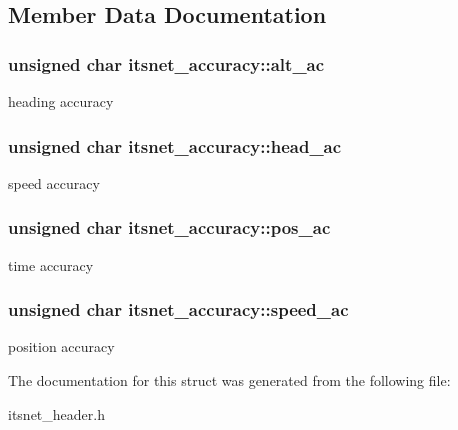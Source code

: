 \subsection{\-Member \-Data \-Documentation}
\hypertarget{structitsnet__accuracy_a5bcb1aa5a4fa5671af7fc234fd1ff14c}{
\subsubsection[{alt\-\_\-ac}]{\setlength{\rightskip}{0pt plus 5cm}unsigned char {\bf itsnet\-\_\-accuracy\-::alt\-\_\-ac}}}\label{structitsnet__accuracy_a5bcb1aa5a4fa5671af7fc234fd1ff14c}
heading accuracy \hypertarget{structitsnet__accuracy_a08bb692a2154f4499d2749034774d48f}{
\subsubsection[{head\-\_\-ac}]{\setlength{\rightskip}{0pt plus 5cm}unsigned char {\bf itsnet\-\_\-accuracy\-::head\-\_\-ac}}}\label{structitsnet__accuracy_a08bb692a2154f4499d2749034774d48f}
speed accuracy \hypertarget{structitsnet__accuracy_acde597cca8f6b0df3fa50d0c7ac3314c}{
\subsubsection[{pos\-\_\-ac}]{\setlength{\rightskip}{0pt plus 5cm}unsigned char {\bf itsnet\-\_\-accuracy\-::pos\-\_\-ac}}}\label{structitsnet__accuracy_acde597cca8f6b0df3fa50d0c7ac3314c}
time accuracy \hypertarget{structitsnet__accuracy_aade23fb3b4f231e31eb464e88cf2dae1}{
\subsubsection[{speed\-\_\-ac}]{\setlength{\rightskip}{0pt plus 5cm}unsigned char {\bf itsnet\-\_\-accuracy\-::speed\-\_\-ac}}}\label{structitsnet__accuracy_aade23fb3b4f231e31eb464e88cf2dae1}
position accuracy 

\-The documentation for this struct was generated from the following file\-:\begin{DoxyCompactItemize}
\item 
itsnet\-\_\-header.\-h\end{DoxyCompactItemize}
